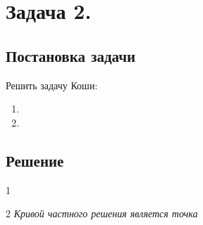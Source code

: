

\section{Задача 2.}
\subsection{Постановка задачи}

Решить задачу Коши:

\begin{enumerate}                                            
	\item
		\customCases
			{\equationFirst}
			{\conditionFirst}
	\item
		\customCases
			{\equationSecond}
			{\conditionSecond}
\end{enumerate}

\newpage

\subsection{Решение}
\begin{enumerate}
	\taskTwoSolutionItem
		{\equationFirst}
		{\solutionFirst}
		{\conditionFirst}
		{\constantFirst}
		{\solutionFirst[\constantFirst]}
		{1}

	\newpage

	\taskTwoSolutionItem
		{\equationSecond}
		{\solutionSecond}
		{\conditionSecond}
		{\constantSecond}
		{\solutionSecond[{}]}
		{2}
		\centering \textit{Кривой частного решения является точка}
	
\end{enumerate}
